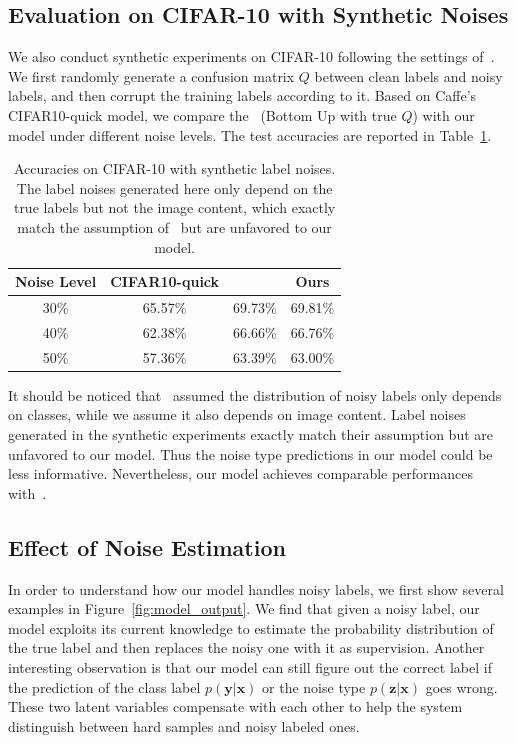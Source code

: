 \documentclass[10pt,twocolumn,letterpaper]{article}
\def\vec{\mathbf}
\begin{document}
\subsection{Evaluation on CIFAR-10 with Synthetic Noises} %
\label{sub:evaluation_on_synthetic_dataset}
We also conduct synthetic experiments on CIFAR-10 following the settings of~\cite{sukhbaatar2014learning}. We first randomly generate a confusion matrix $Q$ between clean labels and noisy labels, and then corrupt the training labels according to it. Based on Caffe's CIFAR10-quick model, we compare the~\cite{sukhbaatar2014learning} (Bottom Up with true $Q$) with our model under different noise levels. The test accuracies are reported in Table~\ref{tab:accuracy_synthetic}.

\begin{table}
\begin{center}
\begin{tabular}{c|c|c|c}
\hline
Noise Level & CIFAR10-quick & \cite{sukhbaatar2014learning} & Ours \\
\hline\hline
30\% & 65.57\% & 69.73\% & 69.81\% \\
\hline
40\% & 62.38\% & 66.66\% & 66.76\% \\
\hline
50\% & 57.36\% & 63.39\% & 63.00\% \\
\hline
\end{tabular}
\end{center}
\caption{Accuracies on CIFAR-10 with synthetic label noises. The label noises generated here only depend on the true labels but not the image content, which exactly match the assumption of~\cite{sukhbaatar2014learning} but are unfavored to our model.}
\label{tab:accuracy_synthetic}
\end{table}

It should be noticed that~\cite{sukhbaatar2014learning} assumed the distribution of noisy labels only depends on classes, while we assume it also depends on image content. Label noises generated in the synthetic experiments exactly match their assumption but are unfavored to our model. Thus the noise type predictions in our model could be less informative. Nevertheless, our model achieves comparable performances with~\cite{sukhbaatar2014learning}.


\subsection{Effect of Noise Estimation} %
\label{sub:effect_of_noise_estimation}
In order to understand how our model handles noisy labels, we first show several examples in Figure~\ref{fig:model_output}. We find that given a noisy label, our model exploits its current knowledge to estimate the probability distribution of the true label and then replaces the noisy one with it as supervision. Another interesting observation is that our model can still figure out the correct label if the prediction of the class label $p(\vec{y}|\vec{x})$ or the noise type $p(\vec{z}|\vec{x})$ goes wrong. These two latent variables compensate with each other to help the system distinguish between hard samples and noisy labeled ones.
\end{document}

